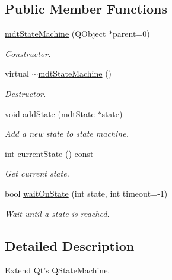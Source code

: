\subsection*{Public Member Functions}
\begin{DoxyCompactItemize}
\item 
\hyperlink{classmdt_state_machine_af2b15b9b0bbf48c6adb75a69dd255718}{mdtStateMachine} (QObject $\ast$parent=0)
\begin{DoxyCompactList}\small\item\em Constructor. \end{DoxyCompactList}\item 
\hypertarget{classmdt_state_machine_ac32776aa0587ec290576e6e2cafb631f}{
virtual \hyperlink{classmdt_state_machine_ac32776aa0587ec290576e6e2cafb631f}{$\sim$mdtStateMachine} ()}
\label{classmdt_state_machine_ac32776aa0587ec290576e6e2cafb631f}

\begin{DoxyCompactList}\small\item\em Destructor. \end{DoxyCompactList}\item 
void \hyperlink{classmdt_state_machine_a827fffcccafebfdf0dddb6a65d75b0bf}{addState} (\hyperlink{classmdt_state}{mdtState} $\ast$state)
\begin{DoxyCompactList}\small\item\em Add a new state to state machine. \end{DoxyCompactList}\item 
\hypertarget{classmdt_state_machine_a16a99b2d6d077e1ea39622ef0e2b5a5b}{
int \hyperlink{classmdt_state_machine_a16a99b2d6d077e1ea39622ef0e2b5a5b}{currentState} () const }
\label{classmdt_state_machine_a16a99b2d6d077e1ea39622ef0e2b5a5b}

\begin{DoxyCompactList}\small\item\em Get current state. \end{DoxyCompactList}\item 
bool \hyperlink{classmdt_state_machine_ab14dc03757e493d35d510af8a1b436b6}{waitOnState} (int state, int timeout=-\/1)
\begin{DoxyCompactList}\small\item\em Wait until a state is reached. \end{DoxyCompactList}\end{DoxyCompactItemize}


\subsection{Detailed Description}
Extend Qt's QStateMachine. 


